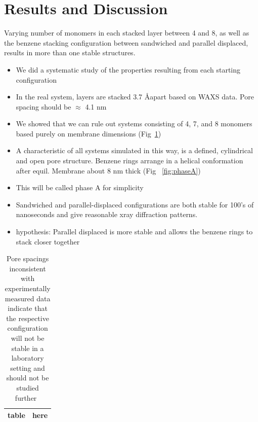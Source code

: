 \documentclass{article}
\newcommand{\angstrom}{\textup{\AA}}
\begin{document}
	\section{Results and Discussion}
	
	Varying number of monomers in each stacked layer between 4 and 8, as well as the benzene stacking configuration between sandwiched and parallel displaced, results in more than one stable structures.
        \begin{itemize}
                \item We did a systematic study of the properties resulting from each starting configuration
		\item In the real system, layers are stacked 3.7 \angstrom apart based on WAXS data. Pore spacing should be $\approx$ 4.1 nm
		\item We showed that we can rule out systems consisting of 4, 7, and 8 monomers based purely on membrane dimensions (Fig~\ref{table:p2p})  %
		\item A characteristic of all systems simulated in this way, is a defined, cylindrical and open pore structure. Benzene rings arrange in a helical conformation after equil. Membrane about 8 nm thick (Fig ~\ref{fig:phaseA}) %
		\item This will be called phase A for simplicity  %
		\item Sandwiched and parallel-displaced configurations are both stable for 100's of nanoseconds and give reasonable xray diffraction patterns.
		\item hypothesis: Parallel displaced is more stable and allows the benzene rings to stack closer together  
	\end{itemize} 

	\begin{table}
	\centering
	\begin{tabular}{|c|c|}
	\hline
	table & here \\
	\hline
	\end{tabular}
	\caption{Pore spacings inconsistent with experimentally measured data indicate that the respective configuration will%
not be stable in a laboratory setting and should not be studied further~\label{table:p2p}}  
	\end{table}
\end{document}
